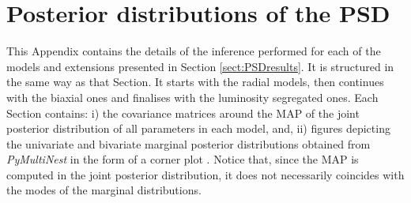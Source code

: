 %
%
%
%

\chapter{Posterior distributions of the PSD \label{app:posteriors}}

 This Appendix contains the details of the inference performed for each of the models and extensions presented in Section \ref{sect:PSDresults}.
 It is structured in the same way as that Section. It starts with the radial models, then continues with the biaxial ones and finalises with the
 luminosity segregated ones. Each Section contains: i) the covariance matrices around the MAP of the joint posterior distribution of all parameters in each model, and, ii) figures depicting the univariate and bivariate marginal posterior distributions obtained from \emph{PyMultiNest} in the form of a corner plot \citep{corner}. Notice that, since the MAP is computed in the joint posterior distribution, it does not necessarily coincides with the modes of the
marginal distributions. 

